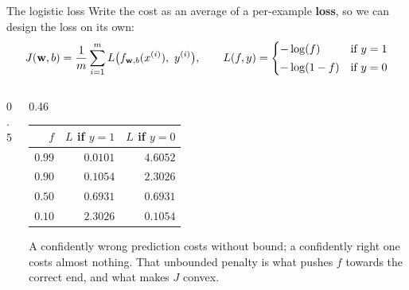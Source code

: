 \documentclass[aspectratio=169,10pt]{beamer}
\begin{document}
\begin{frame}{The logistic loss}
  \footnotesize
  Write the cost as an average of a per-example \textbf{loss}, so we can design the loss on
  its own:
  \[
    J(\mathbf{w},b) = \frac{1}{m}\sum_{i=1}^{m} L\bigl(f_{\mathbf{w},b}(x^{(i)}),\ y^{(i)}\bigr),
    \qquad
    L(f,y) = \begin{cases}
      -\log(f) & \text{if } y = 1\\[2pt]
      -\log(1-f) & \text{if } y = 0
    \end{cases}
  \]
  \begin{columns}[T,onlytextwidth]
    \begin{column}{0.5\textwidth}
      \centering
    \end{column}
    \begin{column}{0.46\textwidth}
      \begin{center}\scriptsize
      \renewcommand{\arraystretch}{1.15}
      \begin{tabular}{@{}rrr@{}}
        \toprule
        $f$ & $L$ if $y=1$ & $L$ if $y=0$\\
        \midrule
        $0.99$ & $0.0101$ & $4.6052$\\
        $0.90$ & $0.1054$ & $2.3026$\\
        $0.50$ & $0.6931$ & $0.6931$\\
        $0.10$ & $2.3026$ & $0.1054$\\
        \bottomrule
      \end{tabular}
      \end{center}
      \vspace{1mm}
      A confidently wrong prediction costs without bound; a confidently right one costs almost
      nothing. That unbounded penalty is what pushes $f$ towards the correct end, and what
      makes $J$ convex.
    \end{column}
  \end{columns}
\end{frame}
\end{document}
